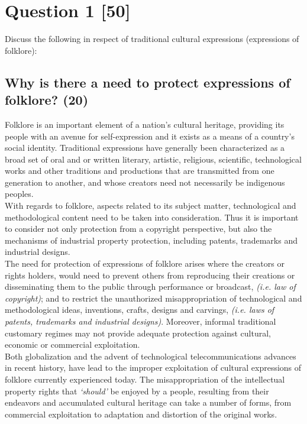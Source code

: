 \documentclass[11pt]{article}
\begin{document}
\section{Question 1 [50]}
\label{sec:orgd8bad80}
Discuss the following in respect of traditional cultural expressions
(expressions of folklore):

\subsection{Why is there a need to protect expressions of folklore? (20)}
\label{sec:org4f61271}

Folklore is an important element of a nation's cultural heritage, providing its
people with an avenue for self-expression and it exists as a means of a
country's social identity. Traditional expressions have generally been
characterized as a broad set of oral and or written literary, artistic,
religious, scientific, technological works and other traditions and productions
that are transmitted from one generation to another, and whose creators need not
necessarily be indigenous peoples.\\

With regards to folklore, aspects related to its subject matter, technological
and methodological content need to be taken into consideration. Thus it is
important to consider not only protection from a copyright perspective, but also
the mechanisms of industrial property protection, including patents, trademarks
and industrial designs.\\

The need for protection of expressions of folklore arises where the creators or
rights holders, would need to prevent others from reproducing their creations or
disseminating them to the public through performance or broadcast, \emph{(i.e. law of
copyright)}; and to restrict the unauthorized misappropriation of technological
and methodological ideas, inventions, crafts, designs and carvings, \emph{(i.e. laws
of patents, trademarks and industrial designs)}. Moreover, informal traditional
customary regimes may not provide adequate protection against cultural, economic
or commercial exploitation.\\

Both globalization and the advent of technological telecommunications advances
in recent history, have lead to the improper exploitation of cultural
expressions of folklore currently experienced today. The misappropriation of the
intellectual property rights that \emph{`should'} be enjoyed by a people, resulting
from their endeavors and accumulated cultural heritage can take a number of
forms, from commercial exploitation to adaptation and distortion of the original
works.\\
\end{document}
